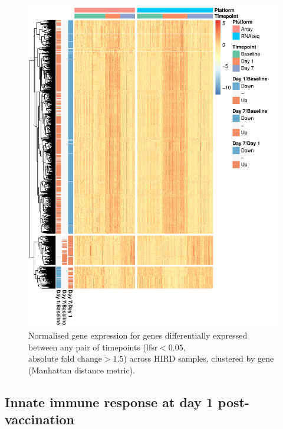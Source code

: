 \begin{figure}
    \includegraphics[width=1.0\textwidth]{mainmatter/figures/chapter_02/plot_dge_eqtl.heatmap_dge.pdf}
    \caption{Normalised gene expression for genes differentially expressed between any pair of timepoints ($\text{lfsr} < 0.05$, $\text{absolute fold change} > 1.5$) across \gls{HIRD} samples, clustered by gene (Manhattan distance metric).}
    \label{fig:hird_dge_heatmap}
\end{figure}

\subsection{Innate immune response at day 1 post-vaccination}

